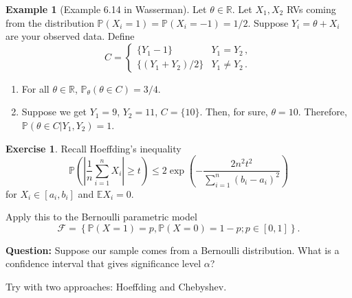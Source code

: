 \documentclass[
  openany]{book}
\theoremstyle{definition}
\theoremstyle{definition}
\newtheorem{example}{Example}[chapter]
\theoremstyle{definition}
\newtheorem{exercise}{Exercise}[chapter]
\theoremstyle{definition}
\theoremstyle{remark}
\begin{document}
\begin{example}[Example 6.14 in Wasserman]

Let \(\theta \in \mathbb{R}\). Let \(X_1, X_2\) RVs coming from the distribution
\(\mathbb{P}(X_i = 1) = \mathbb{P}(X_i = -1) = 1/2\).
Suppose \(Y_i = \theta + X_i\) are your observed data.
Define
\[ C = \begin{cases}
    \{ Y_1 - 1\} & Y_1 = Y_2 \,, \\
    \{ (Y_1 + Y_2)/2 \} & Y_1 \not= Y_2 \,.
\end{cases}\]

\begin{enumerate}
\def\labelenumi{\arabic{enumi}.}
\item
  For all \(\theta\in \mathbb{R}\), \(\mathbb{P}_\theta(\theta \in C ) = 3/4\).
\item
  Suppose we get \(Y_1 = 9\), \(Y_2 = 11\), \(C = \{ 10 \}\). Then, for sure, \(\theta = 10\).
  Therefore,
  \(\mathbb{P}(\theta \in C | Y_1, Y_2) = 1\).
\end{enumerate}

\end{example}

\begin{exercise}
Recall Hoeffding's inequality
\[ \mathbb{P}\left( \left| \frac{1}{n}\sum_{i=1}^n X_i \right| \geq t \right) 
\leq 2  \exp\left( - \frac{2 n^2 t^2}{\sum_{i=1}^n (b_i - a_i)^2}   \right) \]
for \(X_i \in [a_i, b_i]\) and \(\mathbb{E}X_i = 0\).

Apply this to the Bernoulli parametric model
\[\mathcal{F} = \left\{ \mathbb{P}(X= 1) = p, \mathbb{P}(X = 0) = 1-p; p \in [0,1]   \right\}.\]

\textbf{Question:} Suppose our sample comes from a Bernoulli distribution.
What is a confidence interval that gives significance level \(\alpha\)?

Try with two approaches: Hoeffding and Chebyshev.
\end{exercise}
\end{document}

